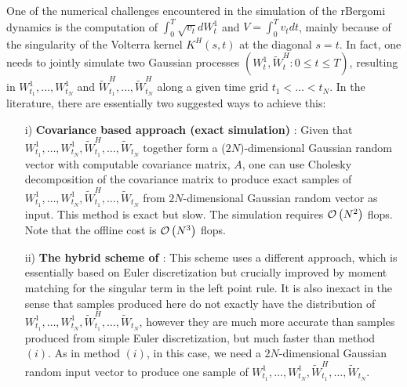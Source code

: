 

One of the numerical challenges encountered in the simulation of the rBergomi dynamics  is the computation of  $\int_{0}^{T} \sqrt{v_t} dW_t^1$ and $V=\int_{0}^{T} v_t dt$, mainly because of the singularity of the Volterra kernel $K^H(s,t)$ at the diagonal $s = t$. In fact,  one needs to jointly simulate two Gaussian processes $(W_t^1, \widetilde{W}^H_t: 0 \le t \le T)$, resulting in $W^1_{t_1},\dots, W^1_{t_N}$ and $\widetilde{W}^H_{t_1},\dots, \widetilde{W}^H_{t_N}$ along a given time grid $t_1 <\dots < t_N$. In the literature, there are essentially two suggested ways to achieve this:
 \begin{enumerate}
 	
 	\item[i)] \textbf{Covariance based approach (exact simulation)} \cite{bayer2016pricing,bayer2018short}: Given that $W^1_{t_1},\dots, W^1_{t_N}, \widetilde{W}^H_{t_1},\dots, \widetilde{W}_{t_N}$ together form a ($2N$)-dimensional Gaussian random vector with computable covariance matrix, $A$, one can use Cholesky decomposition of the covariance matrix to produce exact samples of $W^1_{t_1},\dots, W^1_{t_N},\widetilde{W}^H_{t_1},\dots, \widetilde{W}_{t_N}$ from $2 N$-dimensional Gaussian random vector as  input. This method is exact but slow. The simulation  requires ${\mathcal{O}}\left(N^2\right)$ flops. Note that the offline cost is ${\mathcal{O}}\left(N^3\right)$ flops.
 	
 	\item[ii)]  \textbf{The hybrid scheme of \cite{bennedsen2017hybrid}}: This scheme uses a different approach, which is essentially based on  Euler discretization  but crucially improved by moment
 	matching for the singular term in the left point rule. It is also
 	inexact in the sense that samples produced here do not exactly have the distribution of $W^1_{t_1},\dots, W^1_{t_N}, \widetilde{W}^H_{t_1},\dots, \widetilde{W}_{t_N}$, however they are much more accurate than samples produced from simple Euler discretization, but much faster than method $(i)$. As in method $(i)$, in this case, we need a $2 N$-dimensional Gaussian random input vector to produce one 	sample of $W^1_{t_1},\dots, W^1_{t_N}, \widetilde{W}^H_{t_1},\dots, \widetilde{W}_{t_N}$.
 \end{enumerate}

